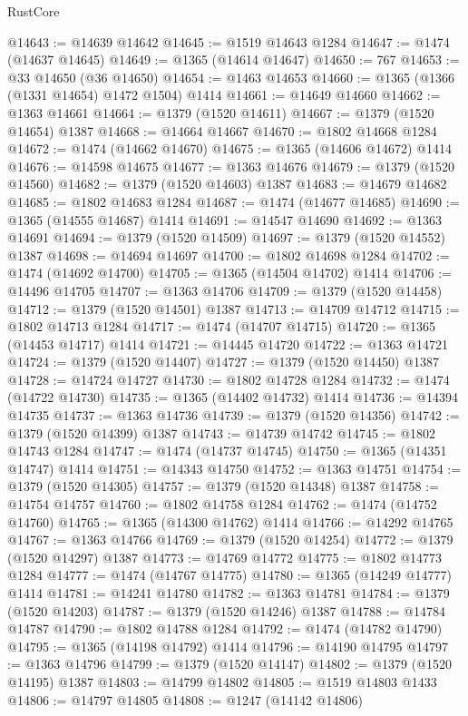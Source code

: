 \begin{lexlean}{RustCore}
\begin{coremodule}
@14643 := @14639 @14642
@14645 := @1519 @14643 @1284
@14647 := @1474 (@14637 @14645)
@14649 := @1365 (@14614 @14647)
@14650 := 767
@14653 := @33 @14650 (@36 @14650)
@14654 := @1463 @14653
@14660 := @1365 (@1366 (@1331 @14654) @1472 @1504) @1414
@14661 := @14649 @14660
@14662 := @1363 @14661
@14664 := @1379 (@1520 @14611)
@14667 := @1379 (@1520 @14654) @1387
@14668 := @14664 @14667
@14670 := @1802 @14668 @1284
@14672 := @1474 (@14662 @14670)
@14675 := @1365 (@14606 @14672) @1414
@14676 := @14598 @14675
@14677 := @1363 @14676
@14679 := @1379 (@1520 @14560)
@14682 := @1379 (@1520 @14603) @1387
@14683 := @14679 @14682
@14685 := @1802 @14683 @1284
@14687 := @1474 (@14677 @14685)
@14690 := @1365 (@14555 @14687) @1414
@14691 := @14547 @14690
@14692 := @1363 @14691
@14694 := @1379 (@1520 @14509)
@14697 := @1379 (@1520 @14552) @1387
@14698 := @14694 @14697
@14700 := @1802 @14698 @1284
@14702 := @1474 (@14692 @14700)
@14705 := @1365 (@14504 @14702) @1414
@14706 := @14496 @14705
@14707 := @1363 @14706
@14709 := @1379 (@1520 @14458)
@14712 := @1379 (@1520 @14501) @1387
@14713 := @14709 @14712
@14715 := @1802 @14713 @1284
@14717 := @1474 (@14707 @14715)
@14720 := @1365 (@14453 @14717) @1414
@14721 := @14445 @14720
@14722 := @1363 @14721
@14724 := @1379 (@1520 @14407)
@14727 := @1379 (@1520 @14450) @1387
@14728 := @14724 @14727
@14730 := @1802 @14728 @1284
@14732 := @1474 (@14722 @14730)
@14735 := @1365 (@14402 @14732) @1414
@14736 := @14394 @14735
@14737 := @1363 @14736
@14739 := @1379 (@1520 @14356)
@14742 := @1379 (@1520 @14399) @1387
@14743 := @14739 @14742
@14745 := @1802 @14743 @1284
@14747 := @1474 (@14737 @14745)
@14750 := @1365 (@14351 @14747) @1414
@14751 := @14343 @14750
@14752 := @1363 @14751
@14754 := @1379 (@1520 @14305)
@14757 := @1379 (@1520 @14348) @1387
@14758 := @14754 @14757
@14760 := @1802 @14758 @1284
@14762 := @1474 (@14752 @14760)
@14765 := @1365 (@14300 @14762) @1414
@14766 := @14292 @14765
@14767 := @1363 @14766
@14769 := @1379 (@1520 @14254)
@14772 := @1379 (@1520 @14297) @1387
@14773 := @14769 @14772
@14775 := @1802 @14773 @1284
@14777 := @1474 (@14767 @14775)
@14780 := @1365 (@14249 @14777) @1414
@14781 := @14241 @14780
@14782 := @1363 @14781
@14784 := @1379 (@1520 @14203)
@14787 := @1379 (@1520 @14246) @1387
@14788 := @14784 @14787
@14790 := @1802 @14788 @1284
@14792 := @1474 (@14782 @14790)
@14795 := @1365 (@14198 @14792) @1414
@14796 := @14190 @14795
@14797 := @1363 @14796
@14799 := @1379 (@1520 @14147)
@14802 := @1379 (@1520 @14195) @1387
@14803 := @14799 @14802
@14805 := @1519 @14803 @1433
@14806 := @14797 @14805
@14808 := @1247 (@14142 @14806)

\end{coremodule}
\end{lexlean}
